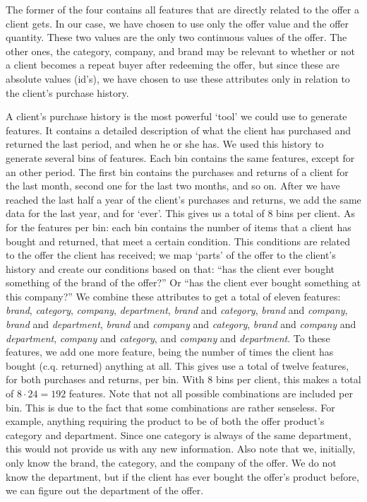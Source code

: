 \documentclass[a4paper]{article}
\begin{document}
The former of the four contains all features that are directly related to the offer a client gets. In our case, we have chosen to use only the offer value and the offer quantity. These two values are the only two continuous values of the offer. The other ones, the category, company, and brand may be relevant to whether or not a client becomes a repeat buyer after redeeming the offer, but since these are absolute values (id's), we have chosen to use these attributes only in relation to the client's purchase history.

A client's purchase history is the most powerful `tool' we could use to generate features. It contains a detailed description of what the client has purchased and returned the last period, and when he or she has. We used this history to generate several bins of features. Each bin contains the same features, except for an other period. The first bin contains the purchases and returns of a client for the last month, second one for the last two months, and so on. After we have reached the last half a year of the client's purchases and returns, we add the same data for the last year, and for `ever'. This gives us a total of 8 bins per client. As for the features per bin: each bin contains the number of items that a client has bought and returned, that meet a certain condition. This conditions are related to the offer the client has received; we map `parts' of the offer to the client's history and create our conditions based on that: ``has the client ever bought something of the brand of the offer?'' Or ``has the client ever bought something at this company?'' We combine these attributes to get a total of eleven features: \emph{brand}, \emph{category}, \emph{company}, \emph{department}, \emph{brand} and \emph{category}, \emph{brand} and \emph{company}, \emph{brand} and \emph{department}, \emph{brand} and \emph{company} and \emph{category}, \emph{brand} and \emph{company} and \emph{department}, \emph{company} and \emph{category}, and \emph{company} and \emph{department}. To these features, we add one more feature, being the number of times the client has bought (c.q. returned) anything at all. This gives use a total of twelve features, for both purchases and returns, per bin. With 8 bins per client, this makes a total of $8\cdot24=192$ features. Note that not all possible combinations are included per bin. This is due to the fact that some combinations are rather senseless. For example, anything requiring the product to be of both the offer product's category and department. Since one category is always of the same department, this would not provide us with any new information. Also note that we, initially, only know the brand, the category, and the company of the offer. We do not know the department, but if the client has ever bought the offer's product before, we can figure out the department of the offer.
\end{document}
